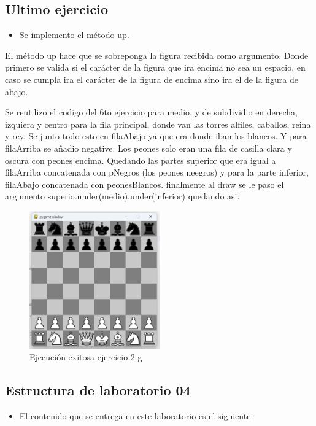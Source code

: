 \documentclass{article}
\begin{document}
	\subsection{Ultimo ejercicio}
	\begin{itemize}	
		\item Se implemento el método up.
	\end{itemize}
	
	El método up hace que se sobreponga la figura recibida como argumento. Donde primero se 
	valida si el carácter de la figura que ira encima no sea un espacio, en caso se cumpla
	ira el carácter de la figura de encima sino ira el de la figura de abajo.
	
	Se reutilizo el codigo del 6to ejercicio para medio. y de subdividio en derecha, izquiera y centro
	para la fila principal, donde van las torres alfiles, caballos, reina y rey. 
	Se junto todo esto en filaAbajo ya que era donde iban los blancos. Y para filaArriba
	se añadio negative. Los peones solo eran una fila de casilla clara y oscura con peones encima.
	Quedando las partes superior que era igual a filaArriba concatenada con pNegros
	(los peones neegros) y para la parte inferior, filaAbajo concatenada con peonesBlancos.
	finalmente al draw se le paso el argumento superio.under(medio).under(inferior) quedando asi.
	\begin{figure}[H]
		\centering
		\includegraphics[width=0.5\textwidth,keepaspectratio]{img/e2g.png}
		\caption{Ejecución exitosa ejercicio 2 g}
	\end{figure}
	\subsection{Estructura de laboratorio 04}
	\begin{itemize}	
		\item El contenido que se entrega en este laboratorio es el siguiente:
	\end{itemize}
	
\end{document}
